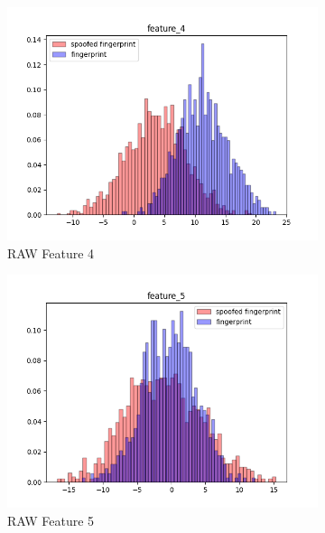 \documentclass[english]{report}
\begin{document}
\begin{figure}[h!]
\begin{subfigure}{0.3\textwidth}
        \includegraphics[scale=0.3]{../../images/feature_plot/hist_feature_4}
        \caption{RAW Feature 4}
    \end{subfigure}
    \begin{subfigure}{0.3\textwidth}
        \includegraphics[scale=0.3]{../../images/feature_plot/hist_feature_5}
        \caption{RAW Feature 5}
    \end{subfigure}
    \begin{subfigure}{0.3\textwidth}

\end{subfigure}
\end{figure}
\end{document}
